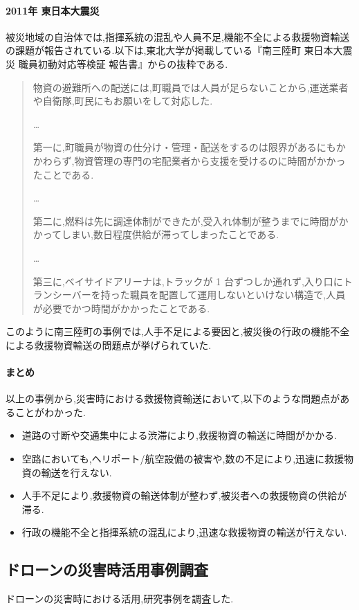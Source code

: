 \documentclass{article}[jsarticle]
\begin{document}
\paragraph{2011年 東日本大震災}
被災地域の自治体では,指揮系統の混乱や人員不足,機能不全による救援物資輸送の課題が報告されている.以下は,東北大学が掲載している『南三陸町 東日本大震災 職員初動対応等検証 報告書』からの抜粋である.
\begin{quote}
    物資の避難所への配送には,町職員では人員が足らないことから,運送業者や自衛隊,町民にもお願いをして対応した.\par 
    \ldots \par
    第一に,町職員が物資の仕分け・管理・配送をするのは限界があるにもかかわらず,物資管理の専門の宅配業者から支援を受けるのに時間がかかったことである.\par 
    \ldots \par
    第二に,燃料は先に調達体制ができたが,受入れ体制が整うまでに時間がかかってしまい,数日程度供給が滞ってしまったことである.\par
    \ldots \par
    第三に,ベイサイドアリーナは,トラックが 1 台ずつしか通れず,入り口にトランシーバーを持った職員を配置して運用しないといけない構造で,人員が必要でかつ時間がかかったことである.
\end{quote}
このように南三陸町の事例では,人手不足による要因と,被災後の行政の機能不全による救援物資輸送の問題点が挙げられていた.
\paragraph{まとめ}
以上の事例から,災害時における救援物資輸送において,以下のような問題点があることがわかった.
\begin{itemize}
    \item 道路の寸断や交通集中による渋滞により,救援物資の輸送に時間がかかる.
    \item 空路においても,ヘリポート/航空設備の被害や,数の不足により,迅速に救援物資の輸送を行えない.
    \item 人手不足により,救援物資の輸送体制が整わず,被災者への救援物資の供給が滞る.
    \item 行政の機能不全と指揮系統の混乱により,迅速な救援物資の輸送が行えない.
\end{itemize}

\subsection{ドローンの災害時活用事例調査}
ドローンの災害時における活用,研究事例を調査した.
\end{document}
